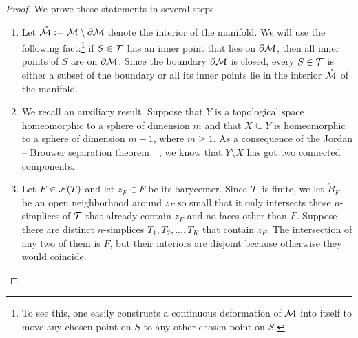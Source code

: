 \documentclass[10pt,letterpaper]{article}
\newcommand\cye[1]{%
  \protect\leavevmode
  \begingroup
    \color{red!35!yellow}%
    #1%
  \endgroup
}
\begin{document}
\begin{proof}
    We prove these statements in several steps.
    \begin{enumerate}
    \item 
    \cye{Let} $\mathring {{\mathcal M}} := {\mathcal M} \setminus \partial {\mathcal M}$ denote the interior of the manifold. 
    We will use the following fact:\footnote{To see this, one easily constructs a continuous deformation of ${\mathcal M}$ into itself to move any chosen point on $S$ to any other chosen point on $S$.} if $S \in {\mathcal T}$ has an inner point that lies on $\partial {\mathcal M}$, then all inner points of $S$ are on $\partial {\mathcal M}$. 
    Since the boundary $\partial {\mathcal M}$ is closed, every $S \in {\mathcal T}$ is either a subset of the boundary or all its inner points lie in the interior $\mathring {{\mathcal M}}$ of the manifold. 
    
    \item 
    We recall an auxiliary result.
    Suppose that $Y$ is a topological space homeomorphic to a sphere of dimension $m$ and that $X \subseteq Y$ is homeomorphic to a sphere of dimension $m-1$, where $m \geq 1$. 
    As a consequence of the Jordan\cye{--}Brouwer separation theorem~\cite[Corollary IV.5.24]{mayer1989algebraische}~\cite[Corollary VIII.6.4]{massey1981algebraic}, 
    we know that $Y \setminus X$ has got two connected components.
    
    
    \item
    Let $F \in {\mathcal F}(T)$ and let $z_F \in F$ be its barycenter. 
    Since ${\mathcal T}$ is finite, we let $\mathring B_F$ be an open neighborhood around $z_F$ so small that it only intersects those $n$-simplices of ${\mathcal T}$ that already contain $z_F$ and no faces other than $F$.
    Suppose there are distinct $n$-simplices $T_1, T_2, \dots, T_K$ that contain $z_F$. 
    The intersection of any two of them is $F$, but their interiors are disjoint because otherwise they would coincide. 
    

\end{enumerate}
\end{proof}
\end{document}
